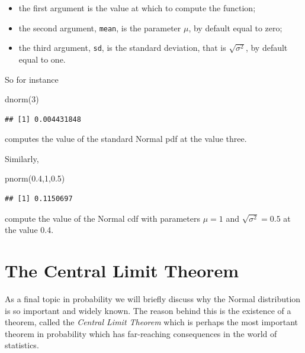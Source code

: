 \documentclass[
]{book}
\newenvironment{Shaded}{\begin{snugshade}}{\end{snugshade}}
\newcommand{\DecValTok}[1]{\textcolor[rgb]{0.00,0.00,0.81}{#1}}
\newcommand{\FloatTok}[1]{\textcolor[rgb]{0.00,0.00,0.81}{#1}}
\newcommand{\FunctionTok}[1]{\textcolor[rgb]{0.00,0.00,0.00}{#1}}
\newcommand{\NormalTok}[1]{#1}
\theoremstyle{definition}
\theoremstyle{definition}
\theoremstyle{definition}
\theoremstyle{definition}
\theoremstyle{remark}
\begin{document}
\begin{itemize}
\item
  the first argument is the value at which to compute the function;
\item
  the second argument, \texttt{mean}, is the parameter \(\mu\), by default equal to zero;
\item
  the third argument, \texttt{sd}, is the standard deviation, that is \(\sqrt{\sigma^2}\), by default equal to one.
\end{itemize}

So for instance

\begin{Shaded}
\begin{Highlighting}[]
\FunctionTok{dnorm}\NormalTok{(}\DecValTok{3}\NormalTok{)}
\end{Highlighting}
\end{Shaded}

\begin{verbatim}
## [1] 0.004431848
\end{verbatim}

computes the value of the standard Normal pdf at the value three.

Similarly,

\begin{Shaded}
\begin{Highlighting}[]
\FunctionTok{pnorm}\NormalTok{(}\FloatTok{0.4}\NormalTok{,}\DecValTok{1}\NormalTok{,}\FloatTok{0.5}\NormalTok{)}
\end{Highlighting}
\end{Shaded}

\begin{verbatim}
## [1] 0.1150697
\end{verbatim}

compute the value of the Normal cdf with parameters \(\mu=1\) and \(\sqrt{\sigma^2}=0.5\) at the value 0.4.

\hypertarget{the-central-limit-theorem}{%
\section{The Central Limit Theorem}\label{the-central-limit-theorem}}

As a final topic in probability we will briefly discuss why the Normal distribution is so important and widely known. The reason behind this is the existence of a theorem, called the \emph{Central Limit Theorem} which is perhaps the most important theorem in probability which has far-reaching consequences in the world of statistics.
\end{document}
